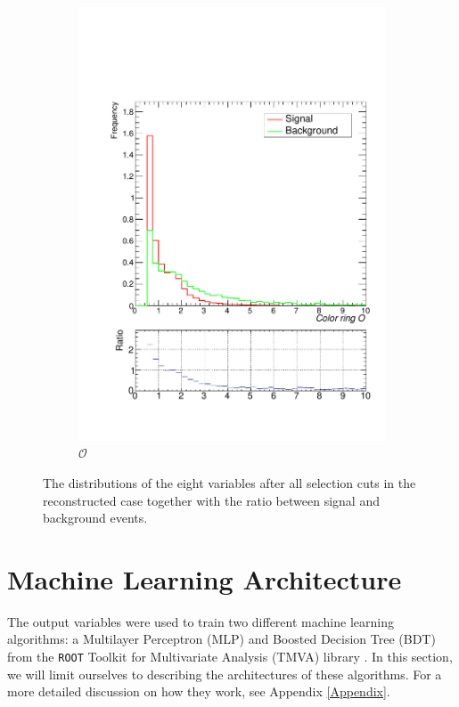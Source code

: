 \documentclass[10pt,a4paper]{book}
\def\code#1{\texttt{#1}}
\begin{document}
\begin{figure}
\begin{subfigure}{.5\textwidth}
\includegraphics[scale=0.25]{reco/cr}
\caption{$\mathcal{O}$}
\end{subfigure}
\caption{The distributions of the eight variables after all selection cuts in the reconstructed case together with the ratio between signal and background events.}
\label{sgn/bkg reco}
\end{figure}


\section{Machine Learning Architecture}
The output variables were used to train two different machine learning algorithms: a Multilayer Perceptron (MLP) and Boosted Decision Tree (BDT) from the \code{ROOT} Toolkit for Multivariate Analysis (TMVA) library \cite{TMVA}. In this section, we will limit ourselves to describing the architectures of these algorithms. For a more detailed discussion on how they work, see Appendix \ref{Appendix}.
\end{document}
